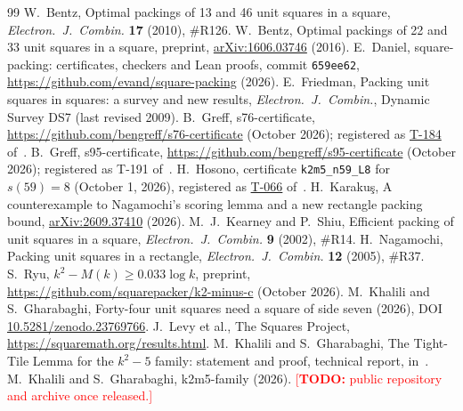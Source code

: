 \documentclass[11pt]{amsart}
\theoremstyle{definition}
\theoremstyle{remark}
\newcommand{\todo}[1]{\textcolor{red}{[\textbf{TODO:} #1]}}
\begin{document}
\begin{thebibliography}{99}
 W.~Bentz, Optimal packings of 13 and 46 unit squares in a square, \emph{Electron.\ J.\ Combin.}
\textbf{17} (2010), \#R126.
 W.~Bentz, Optimal packings of 22 and 33 unit squares in a square, preprint,
\href{https://arxiv.org/abs/1606.03746}{arXiv:1606.03746} (2016).
 E.~Daniel, square-packing: certificates, checkers and Lean proofs, commit \texttt{659ee62},
\url{https://github.com/evand/square-packing} (2026).
 E.~Friedman, Packing unit squares in squares: a survey and new results,
\emph{Electron.\ J.\ Combin.}, Dynamic Survey DS7 (last revised 2009).
 B.~Greff, s76-certificate, \url{https://github.com/bengreff/s76-certificate} (October 2026);
registered as \href{https://squaremath.org/result/t-184.html}{T-184} of~\cite{squares}.
 B.~Greff, s95-certificate, \url{https://github.com/bengreff/s95-certificate} (October 2026);
registered as T-191 of~\cite{squares}.
 H.~Hosono, certificate \texttt{k2m5\_n59\_L8} for $s(59)=8$ (October 1, 2026), registered as
\href{https://squaremath.org/result/t-066.html}{T-066} of~\cite{squares}.
 H.~Karaku\c{s}, A counterexample to Nagamochi's scoring lemma and a new rectangle packing
bound, \href{https://arxiv.org/abs/2609.37410}{arXiv:2609.37410} (2026).
 M.~J.~Kearney and P.~Shiu, Efficient packing of unit squares in a square, \emph{Electron.\ J.\
Combin.} \textbf{9} (2002), \#R14.
 H.~Nagamochi, Packing unit squares in a rectangle, \emph{Electron.\ J.\ Combin.}
\textbf{12} (2005), \#R37.
 S.~Ryu, $k^2-M(k)\ge0.033\log k$, preprint, \url{https://github.com/squarepacker/k2-minus-c}
(October 2026).
 M.~Khalili and S.~Gharabaghi, Forty-four unit squares need a square of side seven (2026),
DOI \href{https://doi.org/10.5281/zenodo.23769766}{10.5281/zenodo.23769766}.
\bibitem{squares} J.~Levy et al., The Squares Project, \url{https://squaremath.org/results.html}.
\bibitem{ttproof} M.~Khalili and S.~Gharabaghi, The Tight-Tile Lemma for the $k^2-5$ family: statement and proof,
technical report, in~\cite{repo}.
 M.~Khalili and S.~Gharabaghi, k2m5-family (2026). \todo{public repository and archive once
released.}
\end{thebibliography}
\end{document}
